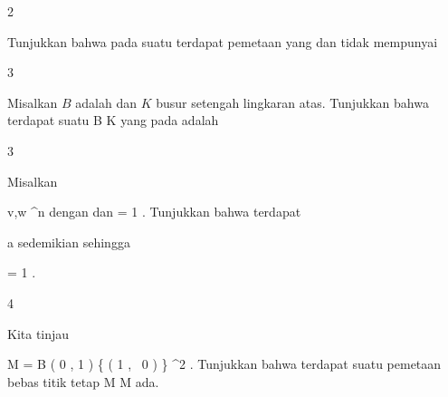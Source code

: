 {2}
{

Tunjukkan bahwa pada suatu
terdapat pemetaan
 yang
dan tidak mempunyai

}
{} {}

{3}
{

Misalkan $B$ adalah
dan $K$ busur setengah lingkaran atas. Tunjukkan bahwa terdapat suatu
\maabbdisp {\varphi} { B } { K
} {}
yang
pada
 adalah

}
{} {}

{3}
{

Misalkan

\mavergleichskette
{\vergleichskette
{ v,w
}
{ \in }{ \R^n
}
{  }{
}
{    }{
}
{   }{
}
}
{}{}{}
dengan
\mathkor {} { \Vert {}} {dan} { \Vert = 1} {.}
Tunjukkan bahwa terdapat

\mavergleichskette
{\vergleichskette
{ a
}
{ \in }{ \R
}
{  }{
}
{    }{
}
{   }{
}
}
{}{}{}
sedemikian sehingga

\mavergleichskette
{\vergleichskette
{  \Vert
}
{ = }{ 1
}
{  }{
}
{    }{
}
{   }{
}
}
{}{}{.}

}
{} {}

{4}
{

Kita tinjau

\mavergleichskettedisp
{\vergleichskette
{ M
}
{ =} { B  \left(  0 , 1 \right) \setminus \{  \left(  1   , \,   0                   \right) \}
}
{ \subseteq} { \R^2
}
{ } {
}
{ } {
}
}
{}{}{.}
Tunjukkan bahwa terdapat suatu pemetaan bebas titik tetap
\maabbdisp {\varphi} { M } { M
} {}
ada.

}
{} {}
